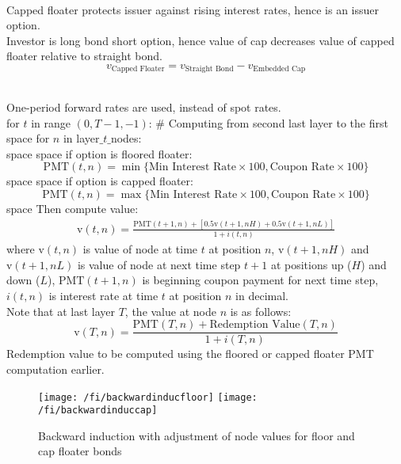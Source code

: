 \begin{remark} \\
Capped floater protects issuer against rising interest rates, hence is an issuer option.\\
Investor is long bond short option, hence value of cap decreases value of capped floater relative to straight bond.
\begin{equation}
v_{\text{Capped Floater}} = v_{\text{Straight Bond}} - v_{\text{Embedded Cap}} \nonumber
\end{equation}
\end{remark}

\begin{method} \\
One-period forward rates are used, instead of spot rates. \\
for $t$ in range $(0, T-1, -1)$: \# Computing from second last layer to the first \\
{\color{white}space} for $n$ in layer$\_t\_$nodes: \\
{\color{white}space} {\color{white}space} if option is floored floater:
\begin{equation}
\text{PMT}(t,n) = \min \{\text{Min Interest Rate} \times 100, \text{Coupon Rate} \times 100\} \nonumber
\end{equation}
{\color{white}space} {\color{white}space} if option is capped floater:
\begin{equation}
\text{PMT}(t,n) = \max \{\text{Min Interest Rate} \times 100, \text{Coupon Rate} \times 100\} \nonumber
\end{equation}
{\color{white}space} Then compute value:
\begin{align}
\text{v}(t,n) = \frac{\text{PMT}(t+1,n)+ [0.5 \text{v}(t+1, nH) + 0.5 \text{v}(t+1, nL)]}{1 + i(t, n)} \nonumber
\end{align}
where $\text{v}(t,n)$ is value of node at time $t$ at position $n$, $\text{v}(t+1,nH)$ and $\text{v}(t+1,nL)$ is value of node at next time step $t+1$ at positions up ($H$) and down ($L$), $\text{PMT}(t+1,n)$ is beginning coupon payment for next time step, $i(t,n)$ is interest rate at time $t$ at position $n$ in decimal. \\
Note that at last layer $T$, the value at node $n$ is as follows:
\begin{equation}
\text{v}(T, n) = \frac{\text{PMT}(T,n) + \text{Redemption Value}(T,n)}{1 + i(T, n)} \nonumber
\end{equation}
Redemption value to be computed using the floored or capped floater PMT computation earlier.
\end{method}

\begin{figure}[H]
\centering
\texttt{[image: /fi/backwardinducfloor]}
\texttt{[image: /fi/backwardinduccap]}
\caption{Backward induction with adjustment of node values for floor and cap floater bonds}
\end{figure}

